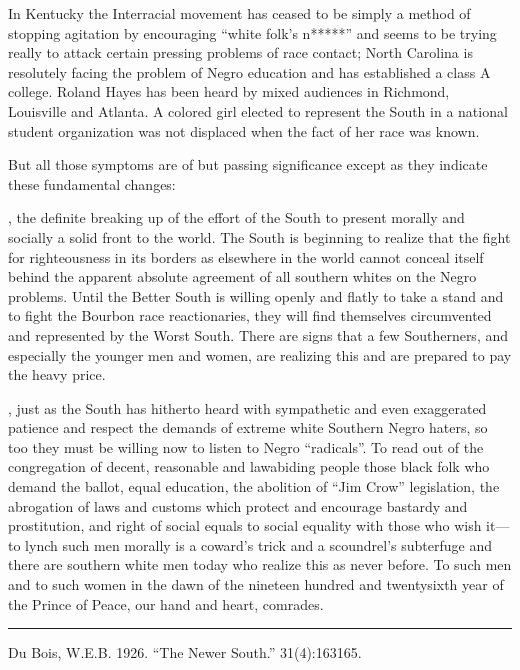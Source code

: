 \documentclass[letterpaper,10pt,english]{jupyterBook}
\begin{document}
\sphinxAtStartPar
In Kentucky the Inter\sphinxhyphen{}racial movement has ceased to be simply a method of stopping agitation by encouraging “white folk’s n*****” and seems to be trying really to attack certain pressing problems of race contact; North Carolina is resolutely facing the problem of Negro education and has established a class A college. Roland Hayes has been heard by mixed audiences in Richmond, Louisville and Atlanta. A colored girl elected to represent the South in a national student organization was not displaced when the fact of her race was known.

\sphinxAtStartPar
But all those symptoms are of but passing significance except as they indicate these fundamental changes:

\sphinxAtStartPar
{}, the definite breaking up of the effort of the South to present morally and socially a solid front to the world. The South is beginning to realize that the fight for righteousness in its borders as elsewhere in the world cannot conceal itself behind the apparent absolute agreement of all southern whites on the Negro problems. Until the Better South is willing openly and flatly to take a stand and to fight the Bourbon race reactionaries, they will find themselves circumvented and represented by the Worst South. There are signs that a few Southerners, and especially the younger men and women, are realizing this and are prepared to pay the heavy price.

\sphinxAtStartPar
{}, just as the South has hitherto heard with sympathetic and even exaggerated patience and respect the demands of extreme white Southern Negro haters, so too they must be willing now to listen to Negro “radicals”. To read out of the congregation of decent, reasonable and law\sphinxhyphen{}abiding people those black folk who demand the ballot, equal education, the abolition of “Jim Crow” legislation, the abrogation of laws and customs which protect and encourage bastardy and prostitution, and right of social equals to social equality with those who wish it—to lynch such men morally is a coward’s trick and a scoundrel’s subterfuge and there are southern white men today who realize this as never before. To such men and to such women in the dawn of the nineteen hundred and twenty\sphinxhyphen{}sixth year of the Prince of Peace, our hand and heart, comrades.


\bigskip\hrule\bigskip


\sphinxAtStartPar
{} Du Bois, W.E.B. 1926. “The Newer South.”  31(4):163\sphinxhyphen{}165.
\end{document}
